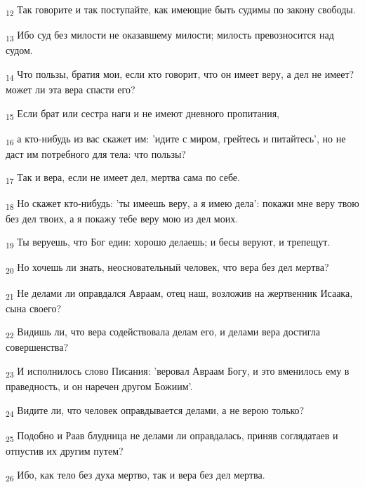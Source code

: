 \begin{tcolorbox}
\textsubscript{12} Так говорите и так поступайте, как имеющие быть судимы по закону свободы.
\end{tcolorbox}
\begin{tcolorbox}
\textsubscript{13} Ибо суд без милости не оказавшему милости; милость превозносится над судом.
\end{tcolorbox}
\begin{tcolorbox}
\textsubscript{14} Что пользы, братия мои, если кто говорит, что он имеет веру, а дел не имеет? может ли эта вера спасти его?
\end{tcolorbox}
\begin{tcolorbox}
\textsubscript{15} Если брат или сестра наги и не имеют дневного пропитания,
\end{tcolorbox}
\begin{tcolorbox}
\textsubscript{16} а кто-нибудь из вас скажет им: 'идите с миром, грейтесь и питайтесь', но не даст им потребного для тела: что пользы?
\end{tcolorbox}
\begin{tcolorbox}
\textsubscript{17} Так и вера, если не имеет дел, мертва сама по себе.
\end{tcolorbox}
\begin{tcolorbox}
\textsubscript{18} Но скажет кто-нибудь: 'ты имеешь веру, а я имею дела': покажи мне веру твою без дел твоих, а я покажу тебе веру мою из дел моих.
\end{tcolorbox}
\begin{tcolorbox}
\textsubscript{19} Ты веруешь, что Бог един: хорошо делаешь; и бесы веруют, и трепещут.
\end{tcolorbox}
\begin{tcolorbox}
\textsubscript{20} Но хочешь ли знать, неосновательный человек, что вера без дел мертва?
\end{tcolorbox}
\begin{tcolorbox}
\textsubscript{21} Не делами ли оправдался Авраам, отец наш, возложив на жертвенник Исаака, сына своего?
\end{tcolorbox}
\begin{tcolorbox}
\textsubscript{22} Видишь ли, что вера содействовала делам его, и делами вера достигла совершенства?
\end{tcolorbox}
\begin{tcolorbox}
\textsubscript{23} И исполнилось слово Писания: 'веровал Авраам Богу, и это вменилось ему в праведность, и он наречен другом Божиим'.
\end{tcolorbox}
\begin{tcolorbox}
\textsubscript{24} Видите ли, что человек оправдывается делами, а не верою только?
\end{tcolorbox}
\begin{tcolorbox}
\textsubscript{25} Подобно и Раав блудница не делами ли оправдалась, приняв соглядатаев и отпустив их другим путем?
\end{tcolorbox}
\begin{tcolorbox}
\textsubscript{26} Ибо, как тело без духа мертво, так и вера без дел мертва.
\end{tcolorbox}

